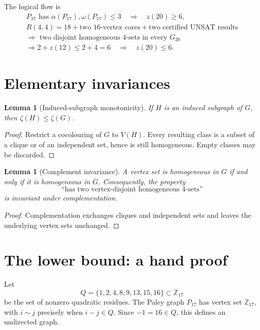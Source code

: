 \documentclass[11pt,a4paper]{article}
\newtheorem{lemma}[theorem]{Lemma}
\theoremstyle{definition}
\theoremstyle{remark}
\begin{document}
The logical flow is
\[
\begin{gathered}
  P_{17}\text{ has }\alpha(P_{17}),\omega(P_{17})\leq3
      \quad\Longrightarrow\quad z(20)\geq6,\\[0.35em]
  R(4,4)=18+\text{two }16\text{-vertex cores}
      +\text{two certified UNSAT results}\\
  \Longrightarrow\text{ two disjoint homogeneous }4\text{-sets in every }G_{20}\\
  \Longrightarrow 2+z(12)\leq 2+4=6
      \quad\Longrightarrow\quad z(20)\leq6.
\end{gathered}
\]

\section{Elementary invariances}

\begin{lemma}[Induced-subgraph monotonicity]\label{lem:monotone}
If \(H\) is an induced subgraph of \(G\), then
\(\zeta(H)\leq\zeta(G)\).
\end{lemma}

\begin{proof}
Restrict a cocolouring of \(G\) to \(V(H)\).  Every resulting class is a
subset of a clique or of an independent set, hence is still homogeneous.
Empty classes may be discarded.
\end{proof}

\begin{lemma}[Complement invariance]\label{lem:complement}
A vertex set is homogeneous in \(G\) if and only if it is homogeneous in
\(\overline G\).  Consequently, the property
\[
  \text{``has two vertex-disjoint homogeneous \(4\)-sets''}
\]
is invariant under complementation.
\end{lemma}

\begin{proof}
Complementation exchanges cliques and independent sets and leaves the
underlying vertex sets unchanged.
\end{proof}

\section{The lower bound: a hand proof}

Let
\[
  Q=\{1,2,4,8,9,13,15,16\}\subset\mathbb Z_{17}
\]
be the set of nonzero quadratic residues.  The Paley graph \(P_{17}\) has
vertex set \(\mathbb Z_{17}\), with \(i\sim j\) precisely when
\(i-j\in Q\).  Since \(-1=16\in Q\), this defines an undirected graph.
\end{document}
